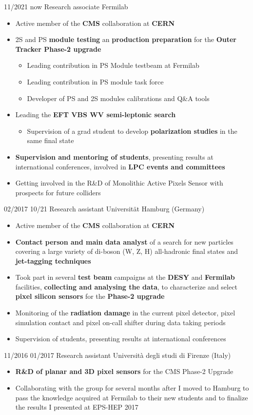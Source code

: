   \position
  {11/2021  \textemdash{} now} 
   {Research associate}
   {Fermilab}
{\begin{itemize}
\item Active member of the {\bf CMS} collaboration at {\bf CERN}
\item 2S and PS {\bf module testing} an {\bf production preparation} for the {\bf Outer Tracker Phase-2 upgrade}
\begin{itemize}
\item Leading contribution in PS Module testbeam at Fermilab
\item Leading contribution in PS module task force
\item Developer of PS and 2S modules calibrations and Q\&A tools
\end{itemize}
\item Leading the {\bf EFT VBS WV semi-leptonic search}
\begin{itemize}
\item Supervision of a grad student to develop {\bf polarization studies} in the same final state
\end{itemize}
\item {\bf Supervision and mentoring of students}, presenting results at international conferences,  involved in {\bf LPC events and committees}
\item Getting involved in the R\&D of Monolithic Active Pixels Sensor with prospects for future colliders
\end{itemize}
}

    \position
      {02/2017 \textemdash{} 10/21}
      {Research assistant}
      {Universit\"{a}t Hamburg (Germany)}
      {\begin{itemize}
\item Active member of the {\bf CMS} collaboration at {\bf CERN}
\item {\bf Contact person and main data analyst} of a search for new particles covering a large variety of di-boson (W, Z, H) all-hadronic final states and {\bf  jet-tagging techniques}
\item Took part in several {\bf test beam} campaigns at the {\bf DESY} and {\bf Fermilab} facilities, {\bf collecting and analysing the data}, to characterize and select {\bf pixel silicon sensors} for the {\bf Phase-2 upgrade}
\item Monitoring of the {\bf radiation damage} in the current pixel detector, pixel simulation contact and pixel on-call shifter during data taking periods
\item Supervision of students, presenting results at international conferences
\end{itemize}
}
    \position
      {11/2016 \textemdash{} 01/2017}
      {Research assistant}
      {Universit\`a degli studi di Firenze (Italy)}
      {\begin{itemize}
\item {\bf R\&D of planar and 3D pixel sensors} for the CMS Phase-2  Upgrade
\item Collaborating with the group for several months after I moved to Hamburg to pass the knowledge acquired at Fermilab to their new students and to finalize the results I presented at EPS-HEP 2017
\end{itemize} 
}

